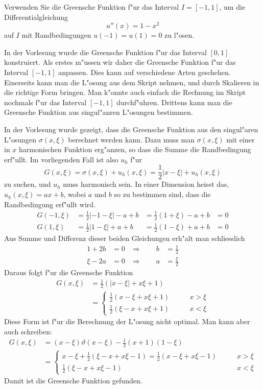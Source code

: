 Verwenden Sie die Greensche Funktion f"ur das Interval $I=[-1,1]$,
um die Differentialgleichung
\[
u''(x)=1-x^2
\]
auf $I$ mit Randbedingungen $u(-1)=u(1)=0$
zu l"osen.

\begin{loesung}
In der Vorlesung wurde die Greensche Funktion f"ur das Interval
$[0,1]$ konstruiert. Als erstes m"ussen wir daher die Greensche
Funktion f"ur das Interval $[-1,1]$ anpassen. Dies kann auf
verschiedene Arten geschehen.
Einerseits kann man die L"osung aus dem
Skript nehmen, und durch Skalieren in die richtige Form bringen.
Man k"onnte auch einfach die Rechnung im Skript nochmals f"ur
das Interval $[-1,1]$ durchf"uhren. Drittens kann man
die Greensche Funktion aus singul"anren L"osungen bestimmen.

In der Vorlesung wurde gezeigt, dass die Greensche Funktion
aus den singul"aren L"osungen $\sigma(x,\xi)$ berechnet werden
kann. Dazu muss man $\sigma(x,\xi)$ mit einer in $x$ harmonischen
Funktion erg"anzen, so dass die Summe die Randbedingung erf"ullt.
Im vorliegenden Fall ist also $u_h$ f"ur
\[
G(x,\xi)=\sigma(x,\xi)+u_h(x,\xi)
=
{\textstyle\frac12}|x-\xi|+u_h(x,\xi)
\]
zu suchen, und $u_h$ muss harmonisch sein. In einer Dimension
heisst das,
$u_h(x,\xi)=ax+b$, wobei $a$ und $b$ so zu bestimmen sind, dass die
Randbedingung erf"ullt wird.
\begin{align*}
G(-1,\xi)&={\textstyle\frac12}|-1-\xi|-a+b&={\textstyle\frac12}(1+\xi)-a+b&=0\\
G(1,\xi)&={\textstyle\frac12}|1-\xi|+a+b&={\textstyle\frac12}(1-\xi)+a+b&=0
\end{align*}
Aus Summe und Differenz dieser beiden Gleichungen erh"alt man
schliesslich
\begin{align*}
1+2b&=0&\Rightarrow\qquad b&=\frac12\\
\xi-2a&=0&\Rightarrow\qquad a&=\frac{\xi}2
\end{align*}
Daraus folgt f"ur die Greensche Funktion
\begin{align*}
G(x,\xi)
&=
{\textstyle\frac12}(|x-\xi|+x\xi+1)
\\
&=
\begin{cases}
{\textstyle\frac12}(x-\xi+x\xi + 1)
&\qquad x>\xi\\
{\textstyle\frac12}(\xi-x+x\xi + 1)
&\qquad x<\xi
\end{cases}
\end{align*}
Diese Form ist f"ur die Berechnung der L"osung nicht optimal. Man kann
aber auch schreiben:
\begin{align*}
G(x,\xi)
&=
(x-\xi)\vartheta(x-\xi)-{\textstyle\frac12}(x+1)(1-\xi)
\\
&=
\begin{cases}
x-\xi
+
{\textstyle\frac12}(\xi-x+x\xi-1)
=
{\textstyle\frac12}(x-\xi+x\xi-1)
&\qquad x>\xi\\
{\textstyle\frac12}(\xi-x+x\xi-1)
&\qquad x<\xi
\end{cases}
\end{align*}
Damit ist die Greensche Funktion gefunden.


\end{loesung}
